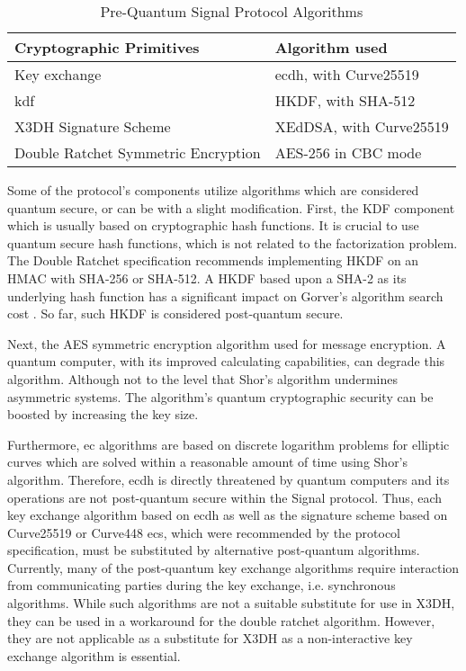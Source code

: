 \begin{table}[htbp]
	\centering
	\caption{Pre-Quantum Signal Protocol Algorithms}
	\label{tab:signal-alg}
	\begin{tabular}{!{\color{black}\vrule}l!{\color{black}\vrule}l!{\color{black}\vrule}} 
		\hline
			Cryptographic Primitives      & Algorithm used      \\ 
		\hline
		\hline
		Key exchange            & \acrshort{ecdh}, with Curve25519  \\ 
		\hline
		\gls{kdf}              & HKDF, with SHA-512    \\ 
		\hline
		X3DH Signature Scheme        & XEdDSA, with Curve25519 \\ 
		\hline
		Double Ratchet Symmetric Encryption & AES-256 in CBC mode   \\
		\hline
	\end{tabular}
\end{table}
Some of the protocol's components utilize algorithms which are considered quantum secure, or can be with a slight modification.
First, the KDF component which is usually based on cryptographic hash functions. It is crucial to use quantum secure hash functions, which is not related to the factorization problem. The Double Ratchet specification recommends implementing HKDF on an HMAC with SHA-256 or SHA-512. A HKDF based upon a SHA-2 as its underlying hash function has a significant impact on Gorver's algorithm search cost \cite{bogomolec2019towards}. So far, such HKDF is considered post-quantum secure.
\par
Next, the AES symmetric encryption algorithm used for message encryption. A quantum computer, with its improved calculating capabilities, can degrade this algorithm. Although not to the level that Shor's algorithm undermines asymmetric systems. The algorithm's quantum cryptographic security can be boosted by increasing the key size.
\par
Furthermore, \gls{ec} algorithms are based on discrete logarithm problems for elliptic curves which are solved within a reasonable amount of time using Shor’s algorithm. Therefore, \gls{ecdh} is directly threatened by quantum computers and its operations are not post-quantum secure within the Signal protocol. Thus, each key exchange algorithm based on \gls{ecdh} as well as the signature scheme based on Curve25519 or Curve448 \glspl{ec}, which were recommended by the protocol specification, must be substituted by alternative post-quantum algorithms. 
Currently, many of the post-quantum key exchange algorithms require interaction from communicating parties during the key exchange, i.e. synchronous algorithms. While such algorithms are not a suitable substitute for use in X3DH, they can be used in a workaround for the double ratchet algorithm. However, they are not applicable as a substitute for X3DH as a non-interactive key exchange algorithm is essential.
